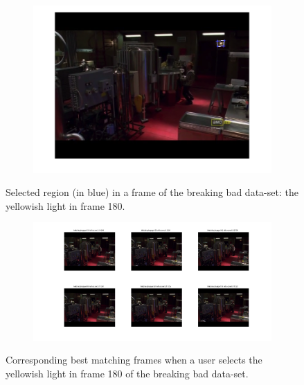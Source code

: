 \documentclass{paper}
\begin{document}
\begin{figure}[!htbp]
\centering
\begin{subfigure}{1.0\textwidth}
\includegraphics[width=\textwidth]{figures/region_queries/bb/selectionRegQ_180}
\end{subfigure}
\caption{Selected region (in blue) in a frame of the breaking bad data-set: the yellowish light in frame 180.}
\label{fig:bb_regionquery_sel3}
\end{figure}

\begin{figure}[!htbp]
\centering
\begin{subfigure}{1.0\textwidth}
\includegraphics[width=\textwidth]{figures/region_queries/bb/matchesRegQ_180}
\end{subfigure}
\caption{Corresponding best matching frames when a user selects the yellowish light in frame 180 of the breaking bad data-set.}
\label{fig:bb_regionquery_matches3}
\end{figure}
\end{document}
